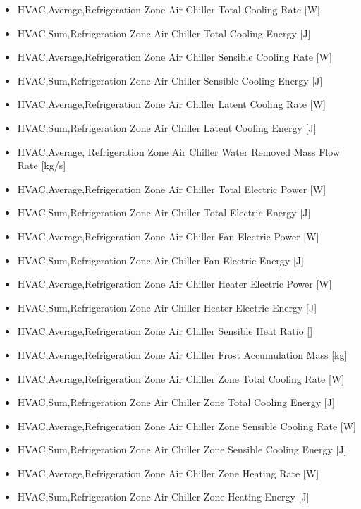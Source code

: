 \begin{itemize}
\item
  HVAC,Average,Refrigeration Zone Air Chiller Total Cooling Rate {[}W{]}
\item
  HVAC,Sum,Refrigeration Zone Air Chiller Total Cooling Energy {[}J{]}
\item
  HVAC,Average,Refrigeration Zone Air Chiller Sensible Cooling Rate {[}W{]}
\item
  HVAC,Sum,Refrigeration Zone Air Chiller Sensible Cooling Energy {[}J{]}
\item
  HVAC,Average,Refrigeration Zone Air Chiller Latent Cooling Rate {[}W{]}
\item
  HVAC,Sum,Refrigeration Zone Air Chiller Latent Cooling Energy {[}J{]}
\item
  HVAC,Average, Refrigeration Zone Air Chiller Water Removed Mass Flow Rate {[}kg/s{]}
\item
  HVAC,Average,Refrigeration Zone Air Chiller Total Electric Power {[}W{]}
\item
  HVAC,Sum,Refrigeration Zone Air Chiller Total Electric Energy {[}J{]}
\item
  HVAC,Average,Refrigeration Zone Air Chiller Fan Electric Power {[}W{]}
\item
  HVAC,Sum,Refrigeration Zone Air Chiller Fan Electric Energy {[}J{]}
\item
  HVAC,Average,Refrigeration Zone Air Chiller Heater Electric Power {[}W{]}
\item
  HVAC,Sum,Refrigeration Zone Air Chiller Heater Electric Energy {[}J{]}
\item
  HVAC,Average,Refrigeration Zone Air Chiller Sensible Heat Ratio {[]}
\item
  HVAC,Average,Refrigeration Zone Air Chiller Frost Accumulation Mass {[}kg{]}
\item
  HVAC,Average,Refrigeration Zone Air Chiller Zone Total Cooling Rate {[}W{]}
\item
  HVAC,Sum,Refrigeration Zone Air Chiller Zone Total Cooling Energy {[}J{]}
\item
  HVAC,Average,Refrigeration Zone Air Chiller Zone Sensible Cooling Rate {[}W{]}
\item
  HVAC,Sum,Refrigeration Zone Air Chiller Zone Sensible Cooling Energy {[}J{]}
\item
  HVAC,Average,Refrigeration Zone Air Chiller Zone Heating Rate {[}W{]}
\item
  HVAC,Sum,Refrigeration Zone Air Chiller Zone Heating Energy {[}J{]}
\end{itemize}

